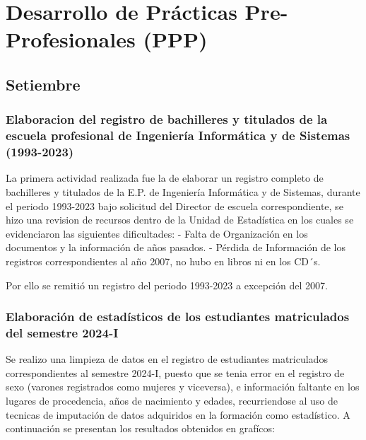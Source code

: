 \documentclass[
  12pt,
  letterpaper,
]{scrreprt}
\begin{document}
\chapter{Desarrollo de Prácticas Pre-Profesionales
(PPP)}\label{desarrollo-de-pruxe1cticas-pre-profesionales-ppp}

\section{Setiembre}\label{setiembre}

\subsection{Elaboracion del registro de bachilleres y titulados de la
escuela profesional de Ingeniería Informática y de Sistemas
(1993-2023)}\label{elaboracion-del-registro-de-bachilleres-y-titulados-de-la-escuela-profesional-de-ingenieruxeda-informuxe1tica-y-de-sistemas-1993-2023}

La primera actividad realizada fue la de elaborar un registro completo
de bachilleres y titulados de la E.P. de Ingeniería Informática y de
Sistemas, durante el periodo 1993-2023 bajo solicitud del Director de
escuela correspondiente, se hizo una revision de recursos dentro de la
Unidad de Estadística en los cuales se evidenciaron las siguientes
dificultades: - Falta de Organización en los documentos y la información
de años pasados. - Pérdida de Información de los registros
correspondientes al año 2007, no hubo en libros ni en los CD´s.

Por ello se remitió un registro del periodo 1993-2023 a excepción del
2007.

\subsection{Elaboración de estadísticos de los estudiantes matriculados
del semestre
2024-I}\label{elaboraciuxf3n-de-estaduxedsticos-de-los-estudiantes-matriculados-del-semestre-2024-i}

Se realizo una limpieza de datos en el registro de estudiantes
matriculados correspondientes al semestre 2024-I, puesto que se tenia
error en el registro de sexo (varones registrados como mujeres y
viceversa), e información faltante en los lugares de procedencia, años
de nacimiento y edades, recurriendose al uso de tecnicas de imputación
de datos adquiridos en la formación como estadístico. A continuación se
presentan los resultados obtenidos en grafícos:
\end{document}
